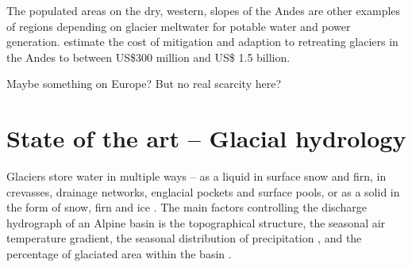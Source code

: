 \documentclass[12pt, a4paper]{article}
\begin{document}
The populated areas on the dry, western, slopes of the Andes are other examples
of regions depending on glacier meltwater for potable water and power
generation. \textcite{vergaraEconomicImpactsRapid2007} estimate the cost of
mitigation and adaption to retreating glaciers in the Andes to between US\$300
million and US\$ 1.5 billion.

Maybe something on Europe? But no real scarcity here?




\section{State of the art -- Glacial hydrology}
Glaciers store water in multiple ways -- as a liquid in surface snow and firn,
in crevasses, drainage networks, englacial pockets and surface pools, or as a
solid in the form of snow, firn and ice
\parencite{janssonConceptGlacierStorage2003}. The main factors controlling the
discharge hydrograph of an Alpine basin is the topographical structure, the
seasonal air temperature gradient, the seasonal distribution of precipitation
\parencite{zappaSeasonalWaterBalance2003}, and the percentage of glaciated area
within the basin \parencite{janssonConceptGlacierStorage2003}. 
\end{document}
